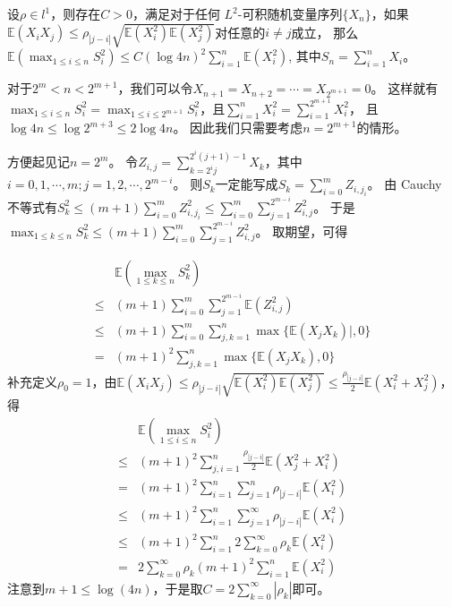 \documentclass{ctexart}
\begin{document}
\begin{problem}\label{pro:2}
  设\(\rho \in l^1 \)，则存在\(C>0 \)，满足对于任何
  \(L^2 \)-可积随机变量序列\(\{X_n\} \)，如果
  \(\mathbb{E}(X_i X_j) \leq \rho_{|j-i|} \sqrt{\mathbb{E}(X_i^2)\mathbb{E}(X_j^2)} \)对任意的\(i \neq j \)成立，
  那么\(\mathbb{E}(\max_{1 \leq i \leq n} S_i^2) \leq C (\log 4n)^2 \sum_{i=1}^{n}\mathbb{E}(X_i^2) \),
  其中\(S_n=\sum_{i=1}^{n}X_i \)。
\end{problem}
\begin{solution}
  对于\(2^m<n < 2^{m+1} \)，我们可以令\(X_{n+1}=X_{n+2}=\cdots=X_{2^{m + 1}} =0 \)。
  这样就有\(\max_{1 \leq i \leq n}S_i^2 = \max_{1 \leq  i \leq 2^{m + 1}}S_i^2 \)，且\(\sum_{i=1}^{n}X_i^2 = \sum_{i=1}^{2^{m + 1}} X_i^2 \)，
  且\(\log 4n \leq \log 2^{m+3} \leq 2 \log 4n \)。
  因此我们只需要考虑\(n= 2^{m + 1} \)的情形。

  方便起见记\(n=2^m \)。
  令\(Z_{i,j}=\sum_{k=2^i j}^{2^i (j+1)-1}X_k \)，其中\(i=0,1,\cdots,m; j=1,2,\cdots,2^{m-i} \)。
  则\(S_k \)一定能写成\(S_k = \sum_{i=0}^{m}Z_{i,j_i} \)。
  由 Cauchy 不等式有\(S_k^2 \leq (m+1)\sum_{i=0}^{m}Z_{i,j_i}^2 \leq \sum_{i=0}^{m}\sum_{j=1}^{2^{m-i }}Z_{i,j}^2\)。
  于是\(\max_{1 \leq k \leq n}S_k^2 \leq (m+1)\sum_{i=0}^{m}\sum_{j=1}^{2^{m-i }}Z_{i,j}^2 \)。
  取期望，可得

  \begin{equation}
    \begin{aligned}
      &\mathbb{E}(\max_{1 \leq k \leq n}S_k^2)\\
      \leq &(m+1) \sum_{i=0}^{m} \sum_{j=1}^{2^{m-i}}\mathbb{E}(Z_{i,j}^2)\\
      \leq &(m+1)\sum_{i=0}^{m}\sum_{j,k=1}^{n} \max\{\mathbb{E}(X_j X_k)|,0\}\\
      =&(m+1)^2 \sum_{j,k=1}^{n} \max \{\mathbb{E}(X_j X_k),0\}
    \end{aligned}
  \end{equation}
  补充定义\(\rho_0=1 \)，由\(\mathbb{E}(X_iX_j) \leq \rho_{|j-i|} \sqrt{\mathbb{E}(X_i^2)\mathbb{E}(X_j^2)} \leq \frac{\rho_{|j-i|}}{2} \mathbb{E}(X_i^2 + X_j^2) \)，
  得
  \begin{equation}
    \begin{aligned}
      &\mathbb{E}(\max_{1 \leq i \leq n}S_i^2)\\
      \leq& (m+1)^2 \sum_{j,i = 1}^{n} \frac{\rho_{|j-i|}}{2}\mathbb{E}(X_j^2 + X_i^2)\\
      =& (m+1)^2 \sum_{i=1}^{n} \sum_{j=1}^{n}\rho_{|j-i|}\mathbb{E}(X_i^2)\\
      \leq&  (m+1)^2 \sum_{i=1}^{n} \sum_{j=1}^{\infty} \rho_{|j-i|}\mathbb{E}(X_i^2)\\
      \leq& (m+1)^2 \sum_{i=1}^{n} 2\sum_{k=0}^{\infty} \rho_k \mathbb{E}(X_i^2)\\
      =& 2\sum_{k=0}^{\infty}\rho_k (m+1)^2 \sum_{i=1}^{n}\mathbb{E}(X_i^2)
    \end{aligned}
  \end{equation}
  注意到\(m+1 \leq \log(4n) \)，于是取\(C=2\sum_{k=0}^{\infty} |\rho_k| \)即可。
\end{solution}
\end{document}

